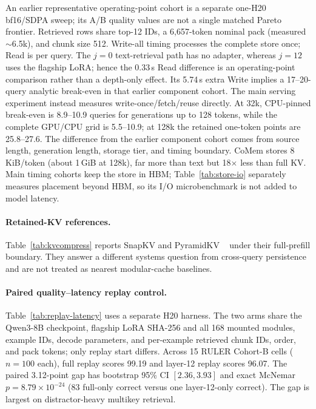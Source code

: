 An earlier representative operating-point cohort is a separate one-H20
bf16/SDPA sweep; its A/B quality values are not a single matched Pareto
frontier. Retrieved rows share top-12 IDs, a 6,657-token nominal pack
(measured $\sim$6.5k), and chunk size 512. Write-all timing processes the
complete store once; Read is per query. The $j{=}0$ text-retrieval path has no
adapter, whereas $j{=}12$ uses the flagship LoRA; hence the 0.33\,s Read
difference is an operating-point comparison rather than a depth-only effect.
Its 5.74\,s extra Write implies a 17--20-query analytic break-even in that
earlier component cohort.
The main serving experiment instead measures write-once/fetch/reuse directly.
At 32k, CPU-pinned break-even is 8.9--10.9 queries for generations up to
128 tokens, while the complete GPU/CPU grid is 5.5--10.9; at 128k the retained
one-token points are 25.8--27.6. The difference from the earlier component
cohort comes from source length, generation length, storage tier, and timing
boundary.
CoMem stores 8\,KiB/token (about
1\,GiB at 128k), far more than text but 18$\times$ less than full KV. Main timing
cohorts keep the store in HBM; Table~\ref{tab:store-io} separately measures
placement beyond HBM, so its I/O microbenchmark is not added to model latency.

\paragraph{Retained-KV references.}
Table~\ref{tab:kvcompress} reports SnapKV and PyramidKV
~\citep{snapkv,pyramidkv} under their full-prefill boundary. They answer a
different systems question from cross-query persistence and are not treated as
nearest modular-cache baselines.



\paragraph{Paired quality--latency replay control.}
Table~\ref{tab:replay-latency} uses a separate H20 harness. The two arms share
the Qwen3-8B checkpoint, flagship LoRA SHA-256 and all 168 mounted modules,
example IDs, decode parameters, and per-example retrieved chunk IDs, order, and
pack tokens; only replay start differs. Across 15 RULER Cohort-B cells
($n{=}100$ each), full replay scores 99.19 and layer-12 replay scores 96.07.
The paired 3.12-point gap has bootstrap 95\% CI $[2.36,3.93]$ and exact McNemar
$p{=}8.79\!\times\!10^{-24}$ (83 full-only correct versus one layer-12-only
correct). The gap is largest on distractor-heavy multikey retrieval.

